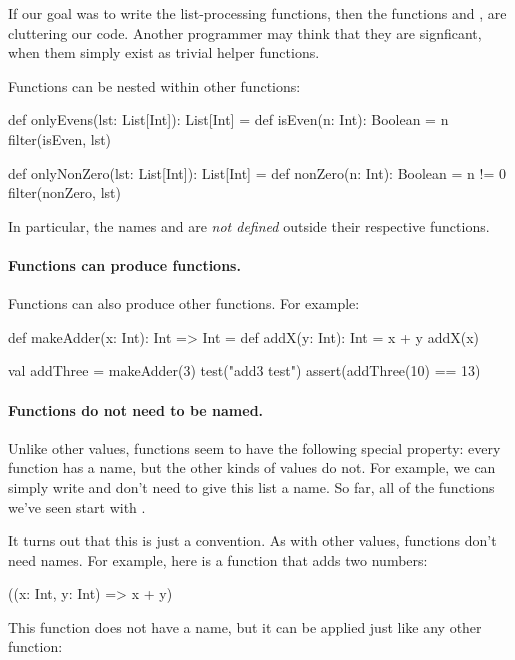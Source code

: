 \documentclass{book}
\begin{document}
If our goal was to write the list-processing functions, then the
functions  and , are
cluttering our code. Another programmer may think that they are signficant,
when them simply exist as trivial helper functions.

Functions can be nested within other functions:
%
\begin{scalacode}
def onlyEvens(lst: List[Int]): List[Int] = {
  def isEven(n: Int): Boolean = n %
  filter(isEven, lst)
}

def onlyNonZero(lst: List[Int]): List[Int] = {
  def nonZero(n: Int): Boolean = n != 0
  filter(nonZero, lst)
}
\end{scalacode}
%
In particular, the names  and 
are \emph{not defined} outside their respective functions.

\paragraph{Functions can produce functions.}

Functions can also produce other functions. For example:
%
\begin{scalacode}
def makeAdder(x: Int): Int => Int = {
  def addX(y: Int): Int = x + y
  addX(x)
}

val addThree = makeAdder(3)
test("add3 test") {
  assert(addThree(10) == 13)
}
\end{scalacode}

\paragraph{Functions do not need to be named.}

Unlike other values, functions seem to have the following special property:
every function has a name, but the other kinds of values do not.
For example, we can simply write 
and don't need to give this list a name. So far, all of the functions we've seen
start with .

It turns out that this is just a convention. As with other values,
functions don't need names. For example, here is a function that adds two
numbers:

\begin{scalacode}
((x: Int, y: Int) => x + y)
\end{scalacode}

This function does not have a name, but it can be applied just like
any other function:
\end{document}
